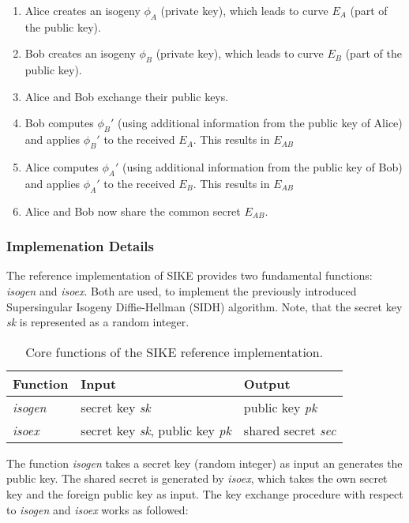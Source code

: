 \begin{enumerate}
\item Alice creates an isogeny $\phi_A$ (private key), which leads to curve $E_A$ (part of the public key).
\item Bob creates an isogeny $\phi_B$ (private key), which leads to curve $E_B$ (part of the public key).
\item Alice and Bob exchange their public keys.
\item Bob computes $\phi_B'$ (using additional information from the public key of Alice) and applies $\phi_B'$ to the received $E_A$. This results in $E_{AB}$
\item Alice computes $\phi_A'$ (using additional information from the public key of Bob) and applies $\phi_A'$ to the received $E_B$. This results in $E_{AB}$
\item Alice and Bob now share the  common secret $E_{AB}$.
\end{enumerate}

\subsubsection{Implemenation Details}

The reference implementation of SIKE \parencite{sike2020spec} provides two fundamental functions: \textit{isogen} and \textit{isoex}. Both are used, to implement the previously introduced Supersingular Isogeny Diffie-Hellman (SIDH) algorithm. Note, that the secret key \textit{sk} is represented as a random integer.
\\

\begin{table}[H]
  \centering
  \begin{tabular}{|K{3cm}|K{3cm}|K{4cm}|}
	\hline
      \textbf{Function} & \textbf{Input} & \textbf{Output} \\
	\hline
      \textit{isogen} & secret key \textit{sk} & public key \textit{pk} \\
     \hline
      \textit{isoex} & secret key \textit{sk}, public key \textit{pk} & shared secret \textit{sec}\\
     \hline
  \end{tabular}
   \caption[Core functions of the SIKE reference implementation]{Core functions of the SIKE reference implementation.}\label{tab:sike_core_functions}
\end{table}

The function \textit{isogen} takes a secret key (random integer) as input an generates the public key. The shared secret is generated by \textit{isoex}, which takes the own secret key and the foreign public key as input. The key exchange procedure with respect to \textit{isogen} and \textit{isoex} works as followed:


